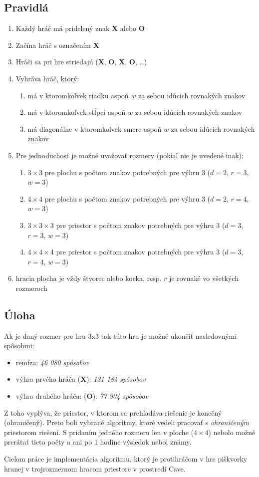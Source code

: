 \subsection{Pravidlá}\label{subsec:rules}

\begin{enumerate}
    \item Každý hráč má pridelený znak \textbf{X} alebo \textbf{O}
    \item Začína hráč s označením \textbf{X}
    \item Hráči sa pri hre striedajú (\textbf{X}, \textbf{O}, \textbf{X}, \textbf{O}, \ldots)
    \item Vyhráva hráč, ktorý:
    \begin{enumerate}
        \item má v ktoromkoľvek riadku aspoň $w$ za sebou idúcich rovnakých znakov
        \item má v ktoromkoľvek stĺpci aspoň $w$ za sebou idúcich rovnakých znakov
        \item má diagonálne v ktoromkoľvek smere aspoň $w$ za sebou idúcich rovnakých znakov
    \end{enumerate}
    \item Pre jednoduchosť je možné uvažovať rozmery (pokiaľ nie je uvedené inak):
    \begin{enumerate}
        \item $3 \times 3$ pre plochu s počtom znakov potrebných pre výhru 3 ($d = 2$, $r = 3$, $w = 3$)
        \item $4 \times 4$ pre plochu s počtom znakov potrebných pre výhru 3 ($d = 2$, $r = 4$, $w = 3$)
        \item $3 \times 3 \times 3$ pre priestor s počtom znakov potrebných pre výhru 3 ($d = 3$, $r = 3$, $w = 3$)
        \item $4 \times 4 \times 4$ pre priestor s počtom znakov potrebných pre výhru 3 ($d = 3$, $r = 4$, $w = 3$)
    \end{enumerate}
    \item hracia plocha je vždy štvorec alebo kocka, resp. $r$ je rovnaké vo všetkých rozmeroch
\end{enumerate}

\subsection{Úloha}\label{subsec:task}

Ak je daný rozmer pre hru 3x3 tak túto hru je možné ukončiť nasledovnými spôsobmi:\cite{number_of_wins}
\begin{itemize}
    \item remíza: \emph{46 080 spôsobov}
    \item výhra prvého hráča (\textbf{X}): \emph{131 184 spôsobov}
    \item výhra druhého hráča: (\textbf{O}): \emph{77 904 spôsobov}
\end{itemize}
Z toho vyplýva, že priestor, v ktorom sa prehľadáva riešenie je konečný (ohraničený).
Preto boli vybrané algoritmy, ktoré vedeli pracovať s \emph{ohraničeným} priestorom riešení.
S pridaním jedného rozmeru len v ploche ($4 \times 4$) nebolo možné prerátať tieto počty a ani po 1 hodine výsledok
nebol známy.

Cieľom práce je implementácia algoritmu, ktorý je protihráčom v hre piškvorky hranej v trojrozmernom hracom priestore
v prostredí Cave.